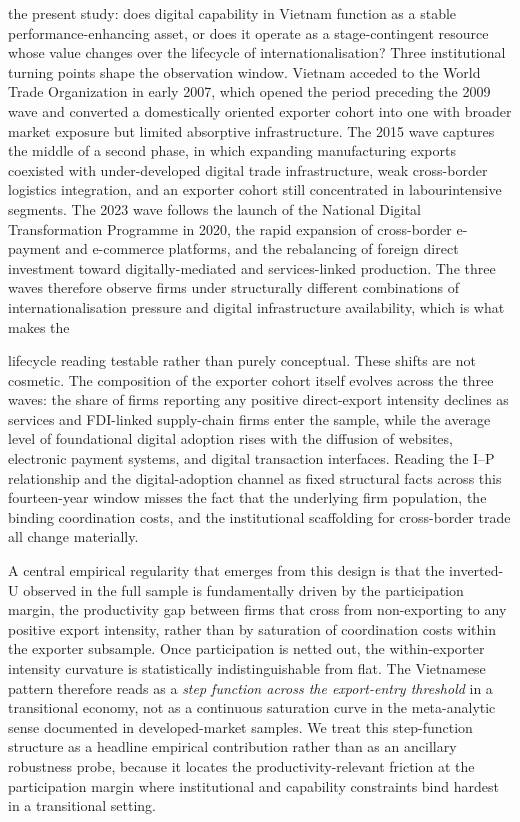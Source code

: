 \documentclass[12pt,a4paper]{article}
\begin{document}
the present study: does digital capability in Vietnam function as a
stable performance-enhancing asset, or does it operate as a
stage-contingent resource whose value changes over the lifecycle of
internationalisation? Three institutional turning points shape the
observation window. Vietnam acceded to the World Trade Organization in
early 2007, which opened the period preceding the 2009 wave and
converted a domestically oriented exporter cohort into one with broader
market exposure but limited absorptive infrastructure. The 2015 wave
captures the middle of a second phase, in which expanding manufacturing
exports coexisted with under-developed digital trade infrastructure,
weak cross-border logistics integration, and an exporter cohort still
concentrated in labourintensive segments. The 2023 wave follows the
launch of the National Digital Transformation Programme in 2020, the
rapid expansion of cross-border e-payment and e-commerce platforms, and
the rebalancing of foreign direct investment toward digitally-mediated
and services-linked production. The three waves therefore observe firms
under structurally different combinations of internationalisation
pressure and digital infrastructure availability, which is what makes
the

lifecycle reading testable rather than purely conceptual. These shifts
are not cosmetic. The composition of the exporter cohort itself evolves
across the three waves: the share of firms reporting any positive
direct-export intensity declines as services and FDI-linked supply-chain
firms enter the sample, while the average level of foundational digital
adoption rises with the diffusion of websites, electronic payment
systems, and digital transaction interfaces. Reading the I--P
relationship and the digital-adoption channel as fixed structural facts
across this fourteen-year window misses the fact that the underlying
firm population, the binding coordination costs, and the institutional
scaffolding for cross-border trade all change materially.

A central empirical regularity that emerges from this design is that the
inverted-U observed in the full sample is fundamentally driven by the
participation margin, the productivity gap between firms that cross from
non-exporting to any positive export intensity, rather than by
saturation of coordination costs within the exporter subsample. Once
participation is netted out, the within-exporter intensity curvature is
statistically indistinguishable from flat. The Vietnamese pattern
therefore reads as a \emph{step function across the export-entry
threshold} in a transitional economy, not as a continuous saturation
curve in the meta-analytic sense documented in developed-market samples.
We treat this step-function structure as a headline empirical
contribution rather than as an ancillary robustness probe, because it
locates the productivity-relevant friction at the participation margin
where institutional and capability constraints bind hardest in a
transitional setting.
\end{document}
